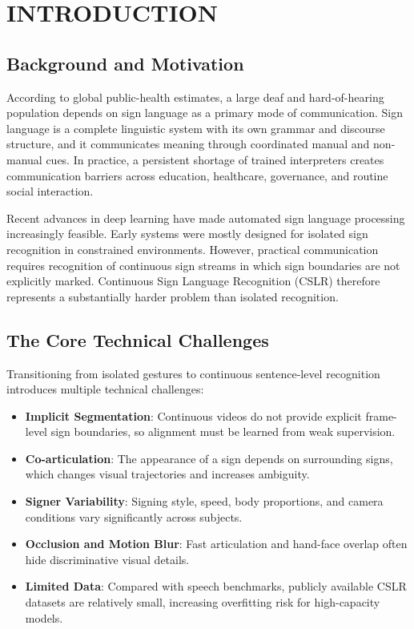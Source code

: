 \chapter{INTRODUCTION}

\section{Background and Motivation}

According to global public-health estimates, a large deaf and hard-of-hearing population depends on sign language as a primary mode of communication. Sign language is a complete linguistic system with its own grammar and discourse structure, and it communicates meaning through coordinated manual and non-manual cues. In practice, a persistent shortage of trained interpreters creates communication barriers across education, healthcare, governance, and routine social interaction.

Recent advances in deep learning have made automated sign language processing increasingly feasible. Early systems were mostly designed for isolated sign recognition in constrained environments. However, practical communication requires recognition of continuous sign streams in which sign boundaries are not explicitly marked. Continuous Sign Language Recognition (CSLR) therefore represents a substantially harder problem than isolated recognition.

\section{The Core Technical Challenges}

Transitioning from isolated gestures to continuous sentence-level recognition introduces multiple technical challenges:

\begin{itemize}
    \item \textbf{Implicit Segmentation}: Continuous videos do not provide explicit frame-level sign boundaries, so alignment must be learned from weak supervision.
    \item \textbf{Co-articulation}: The appearance of a sign depends on surrounding signs, which changes visual trajectories and increases ambiguity.
    \item \textbf{Signer Variability}: Signing style, speed, body proportions, and camera conditions vary significantly across subjects.
    \item \textbf{Occlusion and Motion Blur}: Fast articulation and hand-face overlap often hide discriminative visual details.
    \item \textbf{Limited Data}: Compared with speech benchmarks, publicly available CSLR datasets are relatively small, increasing overfitting risk for high-capacity models.
\end{itemize}

